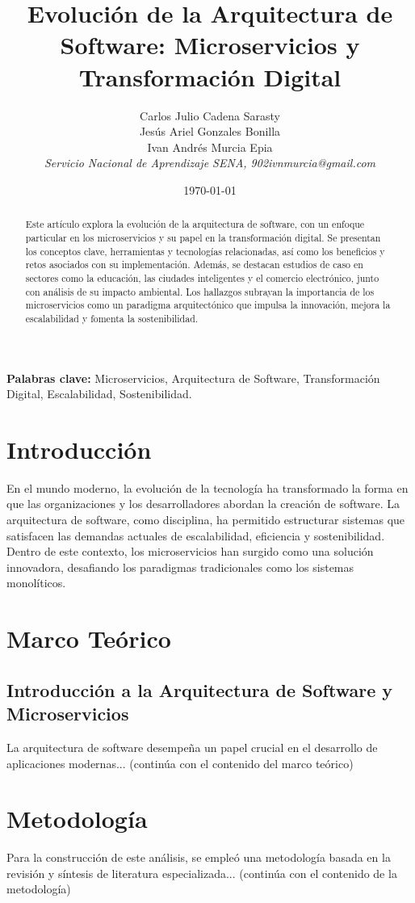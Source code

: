 \documentclass[12pt]{article}
\title{Evoluci\'on de la Arquitectura de Software: Microservicios y Transformaci\'on Digital}
\author{
    Carlos Julio Cadena Sarasty \\ 
    Jes\'us Ariel Gonzales Bonilla \\ 
    Ivan Andr\'es Murcia Epia \\ 
    \textit{Servicio Nacional de Aprendizaje SENA, 902ivnmurcia@gmail.com}
}
\date{\today}
\begin{document}
\maketitle

\begin{abstract}
Este art\'iculo explora la evoluci\'on de la arquitectura de software, con un enfoque particular en los microservicios y su papel en la transformaci\'on digital. Se presentan los conceptos clave, herramientas y tecnolog\'ias relacionadas, as\'i como los beneficios y retos asociados con su implementaci\'on. Adem\'as, se destacan estudios de caso en sectores como la educaci\'on, las ciudades inteligentes y el comercio electr\'onico, junto con an\'alisis de su impacto ambiental. Los hallazgos subrayan la importancia de los microservicios como un paradigma arquitect\'onico que impulsa la innovaci\'on, mejora la escalabilidad y fomenta la sostenibilidad.
\end{abstract}

\textbf{Palabras clave:} Microservicios, Arquitectura de Software, Transformaci\'on Digital, Escalabilidad, Sostenibilidad.

\section{Introducci\'on}
En el mundo moderno, la evoluci\'on de la tecnolog\'ia ha transformado la forma en que las organizaciones y los desarrolladores abordan la creaci\'on de software. La arquitectura de software, como disciplina, ha permitido estructurar sistemas que satisfacen las demandas actuales de escalabilidad, eficiencia y sostenibilidad. Dentro de este contexto, los microservicios han surgido como una soluci\'on innovadora, desafiando los paradigmas tradicionales como los sistemas monol\'iticos.

\section{Marco Te\'orico}
\subsection{Introducci\'on a la Arquitectura de Software y Microservicios}
La arquitectura de software desempe\~na un papel crucial en el desarrollo de aplicaciones modernas... (contin\'ua con el contenido del marco te\'orico)

\section{Metodolog\'ia}
Para la construcci\'on de este an\'alisis, se emple\'o una metodolog\'ia basada en la revisi\'on y s\'intesis de literatura especializada... (contin\'ua con el contenido de la metodolog\'ia)
\end{document}
